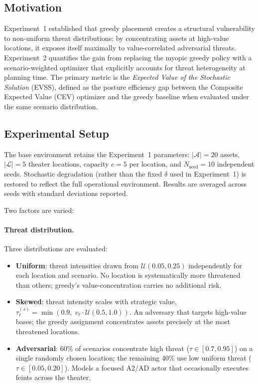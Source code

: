 \documentclass[11pt]{article}
\begin{document}
\subsection{Motivation}

Experiment~1 established that greedy placement creates a structural
vulnerability to non-uniform threat distributions: by concentrating assets
at high-value locations, it exposes itself maximally to value-correlated
adversarial threats.
Experiment~2 quantifies the gain from replacing the myopic greedy policy
with a scenario-weighted optimizer that explicitly accounts for threat
heterogeneity at planning time.
The primary metric is the \emph{Expected Value of the Stochastic Solution}
(EVSS), defined as the posture efficiency gap between the
Composite Expected Value (CEV) optimizer and the greedy baseline when
evaluated under the same scenario distribution.

\subsection{Experimental Setup}
\label{sec:exp2:setup}

The base environment retains the Experiment~1 parameters:
$|\mathcal{A}| = 20$ assets, $|\mathcal{L}| = 5$ theater locations,
capacity $c = 5$ per location, and $N_\mathrm{seed} = 10$ independent seeds.
Stochastic degradation (rather than the fixed $\delta$ used in
Experiment~1) is restored to reflect the full operational environment.
Results are averaged across seeds with standard deviations reported.

Two factors are varied:

\paragraph{Threat distribution.}
Three distributions are evaluated:
\begin{itemize}
    \item \textbf{Uniform}: threat intensities drawn from
          $\mathcal{U}(0.05, 0.25)$ independently for each location and
          scenario.  No location is systematically more threatened than
          others; greedy's value-concentration carries no additional risk.
    \item \textbf{Skewed}: threat intensity scales with strategic value,
          $\tau_\ell^{(s)} = \min\!\left(0.9,\; v_\ell \cdot
          \mathcal{U}(0.5, 1.0)\right)$.  An adversary that targets
          high-value bases; the greedy assignment concentrates assets
          precisely at the most threatened locations.
    \item \textbf{Adversarial}: 60\% of scenarios concentrate high threat
          ($\tau \in [0.7, 0.95]$) on a single randomly chosen location;
          the remaining 40\% use low uniform threat ($\tau \in [0.05,
          0.20]$).  Models a focused A2/AD actor that occasionally executes
          feints across the theater.
\end{itemize}
\end{document}
